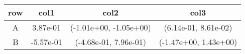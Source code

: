 \begin{tabular}{cccc}
\toprule
row&col1&col2&col3\tabularnewline
\midrule
A&3.87e-01& (-1.01e+00, -1.05e+00)& (6.14e-01, 8.61e-02)\tabularnewline
B&-5.57e-01& (-4.68e-01, 7.96e-01)& (-1.47e+00, 1.43e+00)\tabularnewline
\bottomrule
\end{tabular}
